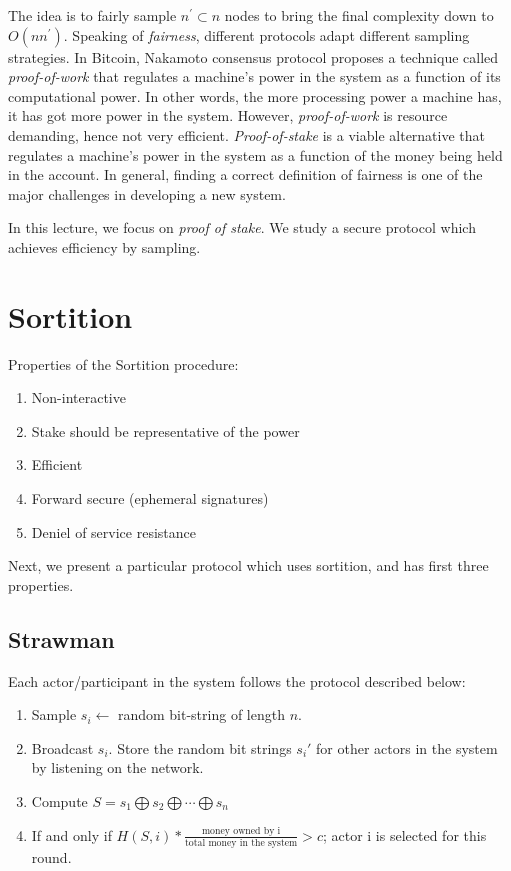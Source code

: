 \documentclass[twoside]{article}
\begin{document}
The idea is to fairly sample $n^\prime \subset n$ nodes to bring the final complexity down to $O(nn^\prime)$.
Speaking of \textit{fairness}, different protocols adapt different sampling strategies.
In Bitcoin, Nakamoto consensus protocol proposes a technique called \textit{proof-of-work} that regulates a machine's power in the system as a function of its computational power.
In other words, the more processing power a machine has, it has got more power in the system.
However, \textit{proof-of-work} is resource demanding, hence not very efficient.
\textit{Proof-of-stake} is a viable alternative that regulates a machine's power in the system as a function of the money being held in the account.
In general, finding a correct definition of fairness is one of the major challenges in developing a new system.

In this lecture, we focus on \textit{proof of stake}. 
We study a secure protocol which achieves efficiency by sampling.

\section{Sortition}

Properties of the Sortition procedure:
\begin{enumerate}
    \item Non-interactive
    \item Stake should be representative of the power
    \item Efficient
    \item Forward secure (ephemeral signatures)
    \item Deniel of service resistance
\end{enumerate}

Next, we present a particular protocol which uses sortition, and has first three properties.

\subsection{Strawman}
\label{subsec:strawman-naive}

Each actor/participant in the system follows the protocol described below:
\begin{enumerate}
    \item Sample $s_{i} \leftarrow{}$ random bit-string of length $n$.
    \item Broadcast $s_{i}$. Store the random bit strings $s_{i}'$ for other actors in the system by listening on the network.
    \item Compute $S = s_{1} \bigoplus s_{2} \bigoplus \cdots \bigoplus s_{n}$
    \item If and only if $H(S, i) * \frac{\mbox{money owned by i}}{\mbox{total money in the system}} > c$; actor i is selected for this round.
\end{enumerate}
\end{document}
